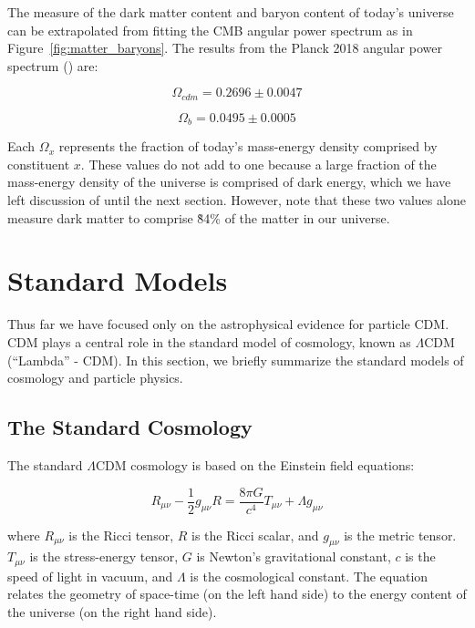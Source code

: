 The measure of the dark matter content and baryon content of today's universe can be extrapolated from fitting the \ac{CMB} angular power spectrum as in Figure~\ref{fig:matter_baryons}. The results from the Planck 2018 angular power spectrum (\cite{Planck2018}) are: 

\begin{equation}
\Omega_{cdm} = 0.2696 \pm 0.0047
\end{equation}

\begin{equation}
\Omega_{b}  = 0.0495 \pm 0.0005 
\end{equation}

Each $\Omega_{x}$ represents the fraction of today's mass-energy density comprised by constituent $x$. These values do not add to one because a large fraction of the mass-energy density of the universe is comprised of dark energy, which we have left discussion of until the next section. However, note that these two values alone measure dark matter to comprise \~84\% of the matter in our universe. 



\section{Standard Models}
Thus far we have focused only on the astrophysical evidence for particle \ac{CDM}. \ac{CDM} plays a central role in the standard model of cosmology, known as $\Lambda$\ac{CDM} (``Lambda'' - \ac{CDM}). In this section, we briefly summarize the standard models of cosmology and particle physics.

\subsection{The Standard Cosmology}
The standard $\Lambda$\ac{CDM} cosmology is based on the Einstein field equations:

\begin{equation}
R_{\mu \nu} - \frac{1}{2} g_{\mu \nu} R = \frac{8 \pi G}{c^{4}} T_{\mu \nu} + \Lambda g_{\mu\nu}
\end{equation}

where $R_{\mu \nu}$ is the Ricci tensor, $R$ is the Ricci scalar, and $g_{\mu\nu}$ is the metric tensor. $T_{\mu \nu}$ is the stress-energy tensor, $G$ is Newton's gravitational constant, $c$ is the speed of light in vacuum, and $\Lambda$ is the cosmological constant. The equation relates the geometry of space-time (on the left hand side) to the energy content of the universe (on the right hand side). 

